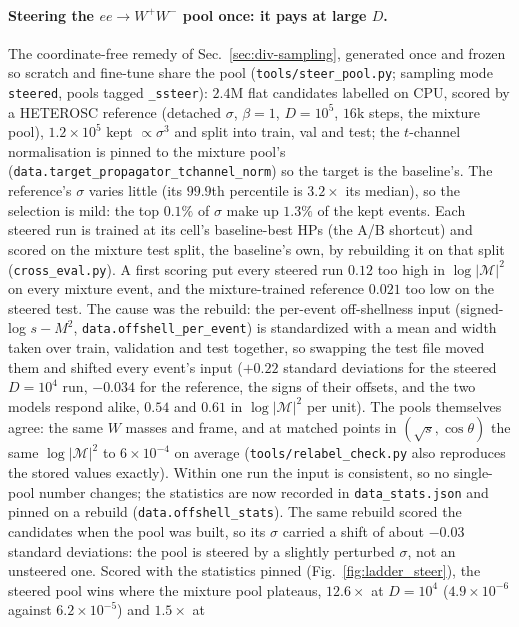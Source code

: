 \documentclass[11pt]{article}
\newcommand{\code}[1]{\texttt{#1}}
\begin{document}
\paragraph{Steering the $ee\to W^+W^-$ pool once: it pays at large $D$.} The coordinate-free remedy of
Sec.~\ref{sec:div-sampling}, generated once and frozen so scratch and fine-tune share the pool
(\code{tools/steer\_pool.py}; sampling mode \code{steered}, pools tagged \code{\_ssteer}): $2.4$M flat
candidates labelled on CPU, scored by a HETEROSC reference (detached $\sigma$, $\beta=1$, $D=10^5$, $16$k
steps, the mixture pool), $1.2\times10^5$ kept $\propto\sigma^3$ and split into train, val and test; the
$t$-channel normalisation is pinned to the mixture pool's (\code{data.target\_propagator\_tchannel\_norm})
so the target is the baseline's. The reference's $\sigma$ varies little (its $99.9$th percentile is
$3.2\times$ its median), so the selection is mild: the top $0.1\%$ of $\sigma$ make up $1.3\%$ of the
kept events. Each steered run is trained at its cell's baseline-best HPs (the A/B shortcut) and scored
on the mixture test split, the baseline's own, by rebuilding it on that split (\code{cross\_eval.py}).
A first scoring put every steered run $0.12$ too high in $\log|\mathcal M|^2$ on every mixture event,
and the mixture-trained reference $0.021$ too low on the steered test. The cause was the rebuild: the
per-event off-shellness input (signed-log $s-M^2$, \code{data.offshell\_per\_event}) is standardized
with a mean and width taken over train, validation and test together, so swapping the test file
moved them and shifted every event's input ($+0.22$ standard deviations for the steered $D=10^4$ run,
$-0.034$ for the reference, the signs of their offsets, and the two models respond alike, $0.54$ and
$0.61$ in $\log|\mathcal M|^2$ per unit). The pools themselves agree: the same $W$ masses and frame,
and at matched points in $(\sqrt s,\cos\theta)$ the same $\log|\mathcal M|^2$ to $6\times10^{-4}$ on average
(\code{tools/relabel\_check.py} also reproduces the stored values exactly). Within one run the input is
consistent, so no single-pool number changes; the statistics are now recorded in
\code{data\_stats.json} and pinned on a rebuild (\code{data.offshell\_stats}). The same rebuild scored
the candidates when the pool was built, so its $\sigma$ carried a shift of about $-0.03$ standard
deviations: the pool is steered by a slightly perturbed $\sigma$, not an unsteered one. Scored with the
statistics pinned (Fig.~\ref{fig:ladder_steer}), the steered pool wins where the mixture pool
plateaus, $12.6\times$ at $D=10^4$ ($4.9\times10^{-6}$ against $6.2\times10^{-5}$) and $1.5\times$ at
\end{document}
